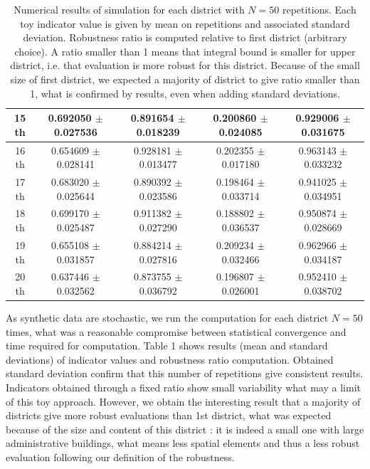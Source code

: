 \documentclass[runningheads,a4paper]{llncs2e/llncs}
\begin{document}
\begin{table}[h!]
\begin{tabular}[6pt]{c|c|c|c|c}
\hline
15 th & 0.692050 $\pm$ 0.027536 & 0.891654 $\pm$ 0.018239 & 0.200860 $\pm$ 0.024085 & 0.929006 $\pm$ 0.031675\\[3pt]
\hline
16 th & 0.654609 $\pm$ 0.028141 & 0.928181 $\pm$ 0.013477 & 0.202355 $\pm$ 0.017180 & 0.963143 $\pm$ 0.033232\\[3pt]
\hline
17 th & 0.683020 $\pm$ 0.025644 & 0.890392 $\pm$ 0.023586 & 0.198464 $\pm$ 0.033714 & 0.941025 $\pm$ 0.034951\\[3pt]
\hline
18 th & 0.699170 $\pm$ 0.025487 & 0.911382 $\pm$ 0.027290 & 0.188802 $\pm$ 0.036537 & 0.950874 $\pm$ 0.028669\\[3pt]
\hline
19 th & 0.655108 $\pm$ 0.031857 & 0.884214 $\pm$ 0.027816 & 0.209234 $\pm$ 0.032466 & 0.962966 $\pm$ 0.034187\\[3pt]
\hline
20 th & 0.637446 $\pm$ 0.032562 & 0.873755 $\pm$ 0.036792 & 0.196807 $\pm$ 0.026001 & 0.952410 $\pm$ 0.038702\\[3pt]
\hline
\end{tabular}

\bigskip

\caption{Numerical results of simulation for each district with $N=50$ repetitions. Each toy indicator value is given by mean on repetitions and associated standard deviation. Robustness ratio is computed relative to first district (arbitrary choice). A ratio smaller than 1 means that integral bound is smaller for upper district, i.e. that evaluation is more robust for this district. Because of the small size of first district, we expected a majority of district to give ratio smaller than 1, what is confirmed by results, even when adding standard deviations.}


\end{table}



As synthetic data are stochastic, we run the computation for each district $N=50$ times, what was a reasonable compromise between statistical convergence and time required for computation. Table 1 shows results (mean and standard deviations) of indicator values and robustness ratio computation. Obtained standard deviation confirm that this number of repetitions give consistent results. Indicators obtained through a fixed ratio show small variability what may a limit of this toy approach. However, we obtain the interesting result that a majority of districts give more robust evaluations than 1st district, what was expected because of the size and content of this district : it is indeed a small one with large administrative buildings, what means less spatial elements and thus a less robust evaluation following our definition of the robustness.
\end{document}
